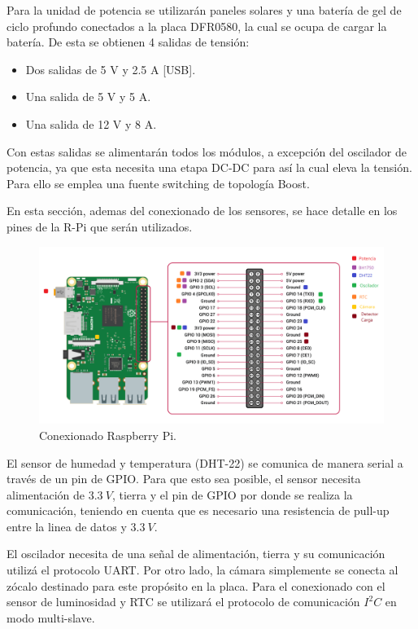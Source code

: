 
Para la unidad de potencia se utilizarán paneles solares y una batería de gel de ciclo profundo conectados a la placa DFR0580, la cual se ocupa de cargar la batería. De esta se obtienen 4 salidas de tensión:
\begin{itemize}
	\item Dos salidas de 5 V y 2.5 A [USB].
	\item Una salida de 5 V y 5 A.
	\item Una salida de 12 V y 8 A.
\end{itemize}

Con estas salidas se alimentarán todos los módulos, a excepción del oscilador de potencia, ya que esta necesita una etapa DC-DC para así la cual eleva la tensión. Para ello se emplea una fuente switching de topología Boost.


En esta sección, ademas del conexionado de los sensores, se hace detalle en los pines de la R-Pi que serán utilizados.

\begin{figure}[H]
	\centering
	\includegraphics[width=0.9\linewidth]{ImagenesIngenieria de Detalle/Conexionado_rpi}		
	\caption{Conexionado Raspberry Pi.}
	\label{fig:conexionado_Rpi}
\end{figure}

El sensor de humedad y temperatura (DHT-22) se comunica de manera serial a través de un pin de GPIO. Para que esto sea posible, el sensor necesita alimentación de $3.3 \ V$, tierra y el pin de GPIO por donde se realiza la comunicación, teniendo en cuenta que es necesario una resistencia de pull-up entre la linea de datos y $3.3 \ V$.

El oscilador necesita de una señal de alimentación, tierra y su comunicación utilizá el protocolo UART. Por otro lado, la cámara simplemente se conecta al zócalo destinado para este propósito en la placa. Para el conexionado con el sensor de luminosidad y RTC se utilizará el protocolo de comunicación $I^2C$ en modo multi-slave.

